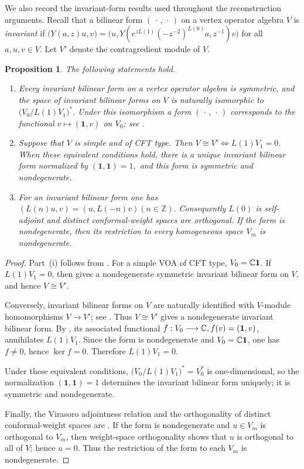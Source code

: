 \documentclass[10pt,a4paper]{amsart}
\numberwithin{equation}{section} \newtheorem{thm}{Theorem}[section] \newtheorem{lem}[thm]{Lemma} \newtheorem{ex}[thm]{Example} \newtheorem{prop}[thm]{Proposition} \newtheorem{cor}[thm]{Corollary} \newtheorem{defi}[thm]{Definition} \newtheorem{rmk}[thm]{Remark} \newtheorem{notation}[thm]{Notation}
\newcommand{\one}{\mathbf{1}}
\begin{document}
We also record the invariant-form results used throughout the reconstruction arguments. Recall that a bilinear form $(\,\cdot\,,\,\cdot\,)$ on a vertex operator algebra $V$ is \emph{invariant} if \(\bigl(Y(a,z)u,v\bigr)=\bigl(u,Y(e^{zL(1)}(-z^{-2})^{L(0)}a,z^{-1})v\bigr)\) for all $a,u,v\in V$. Let $V'$ denote the contragredient module of $V$.

\begin{prop}
\label{prop:Li-invariant-package}
The following statements hold.
\begin{enumerate}[label=\textnormal{(\roman*)}]
\item Every invariant bilinear form on a vertex operator algebra is
symmetric, and the space of invariant bilinear forms on $V$ is naturally isomorphic to \(\bigl(V_0/L(1)V_1\bigr)^*.\) Under this isomorphism a form $(\,\cdot\,,\,\cdot\,)$ corresponds to the functional $v\mapsto(\one,v)$ on $V_0$; see \cite[Proposition~2.6 and Theorem~3.1]{LiInvariant}.

\item Suppose that $V$ is simple and of CFT type.  Then \(V\cong V'\Longleftrightarrow L(1)V_1=0.\)
When these equivalent conditions hold, there is a unique invariant bilinear form normalized by \((\one,\one)=1,\) and this form is symmetric and nondegenerate.

\item For an invariant bilinear form one has \((L(n)u,v)=(u,L(-n)v)(n\in\mathbb Z).\)
Consequently $L(0)$ is self-adjoint and distinct conformal-weight spaces are orthogonal. If the form is nondegenerate, then its restriction to every homogeneous space $V_m$ is nondegenerate.
\end{enumerate}
\end{prop}

\begin{proof}
Part~\textnormal{(i)} follows from \cite[Proposition~2.6 and Theorem~3.1]{LiInvariant}. For a simple VOA of CFT type, $V_0=\C\one$. If $L(1)V_1=0$, then \cite[Corollary~3.2]{LiInvariant} gives a nondegenerate symmetric invariant bilinear form on $V$, and hence $V\cong V'$.

Conversely, invariant bilinear forms on $V$ are naturally identified with $V$-module homomorphisms $V\to V'$; see \cite[p.~284]{LiInvariant}. Thus $V\cong V'$ gives a nondegenerate invariant bilinear form. By \cite[Theorem~3.1]{LiInvariant}, its associated functional \(f:V_0\longrightarrow\C, f(v)=(\one,v)\), annihilates $L(1)V_1$. Since the form is nondegenerate and $V_0=\C\one$, one has $f\ne0$, hence $\ker f=0$. Therefore $L(1)V_1=0$.

Under these equivalent conditions, \(\bigl(V_0/L(1)V_1\bigr)^*=V_0^*\) is one-dimensional, so the normalization $(\one,\one)=1$ determines the invariant bilinear form uniquely; it is symmetric and nondegenerate.

Finally, the Virasoro adjointness relation and the orthogonality of distinct conformal-weight spaces are \cite[(2.21)--(2.23)]{LiInvariant}. If the form is nondegenerate and $u\in V_m$ is orthogonal to $V_m$, then weight-space orthogonality shows that $u$ is orthogonal to all of $V$; hence $u=0$. Thus the restriction of the form to each $V_m$ is nondegenerate.
\end{proof}
\end{document}
